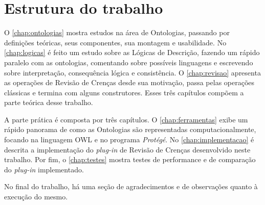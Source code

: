 \section{Estrutura do trabalho}

O \autoref{chap:ontologias} mostra estudos na área de Ontologias, passando por definições teóricas, seus componentes, sua montagem e usabilidade. No \autoref{chap:logicas} é feito um estudo sobre as Lógicas de Descrição, fazendo um rápido paralelo com as ontologias, comentando sobre possíveis linguagens e escrevendo sobre interpretação, consequência lógica e consistência. O \autoref{chap:revisao} apresenta as operações de Revisão de Crenças desde sua motivação, passa pelas operações clássicas e termina com alguns construtores. Esses três capítulos compõem a parte teórica desse trabalho.

A parte prática é composta por três capítulos. O \autoref{chap:ferramentas} exibe um rápido panorama de como as Ontologias são representadas computacionalmente, focando na linguagem OWL e no programa \textit{Protégé}. No \autoref{chap:implementacao} é descrita a implementação do \textit{plug-in} de Revisão de Crenças desenvolvido neste trabalho. Por fim, o \autoref{chap:testes} mostra testes de performance e de comparação do \textit{plug-in} implementado.

No final do trabalho, há uma seção de agradecimentos e de observações quanto à execução do mesmo.